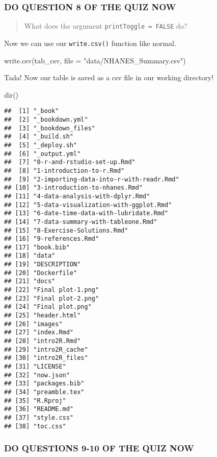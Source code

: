 \documentclass[
]{book}
\newenvironment{Shaded}{\begin{snugshade}}{\end{snugshade}}
\newcommand{\AttributeTok}[1]{\textcolor[rgb]{0.77,0.63,0.00}{#1}}
\newcommand{\FunctionTok}[1]{\textcolor[rgb]{0.00,0.00,0.00}{#1}}
\newcommand{\NormalTok}[1]{#1}
\newcommand{\StringTok}[1]{\textcolor[rgb]{0.31,0.60,0.02}{#1}}
\begin{document}
\hypertarget{do-question-8-of-the-quiz-now-3}{%
\subsubsection{DO QUESTION 8 OF THE QUIZ NOW}\label{do-question-8-of-the-quiz-now-3}}

\begin{quote}
What does the argument \texttt{printToggle\ =\ FALSE} do?
\end{quote}

Now we can use our \texttt{write.csv()} function like normal.

\begin{Shaded}
\begin{Highlighting}[]
\FunctionTok{write.csv}\NormalTok{(tab\_csv, }\AttributeTok{file =} \StringTok{"data/NHANES\_Summary.csv"}\NormalTok{)}
\end{Highlighting}
\end{Shaded}

Tada! Now our table is saved as a csv file in our working directory!

\begin{Shaded}
\begin{Highlighting}[]
\FunctionTok{dir}\NormalTok{()}
\end{Highlighting}
\end{Shaded}

\begin{verbatim}
##  [1] "_book"
##  [2] "_bookdown.yml"
##  [3] "_bookdown_files"
##  [4] "_build.sh"
##  [5] "_deploy.sh"
##  [6] "_output.yml"
##  [7] "0-r-and-rstudio-set-up.Rmd"
##  [8] "1-introduction-to-r.Rmd"
##  [9] "2-importing-data-into-r-with-readr.Rmd"
## [10] "3-introduction-to-nhanes.Rmd"
## [11] "4-data-analysis-with-dplyr.Rmd"
## [12] "5-data-visualization-with-ggplot.Rmd"
## [13] "6-date-time-data-with-lubridate.Rmd"
## [14] "7-data-summary-with-tableone.Rmd"
## [15] "8-Exercise-Solutions.Rmd"
## [16] "9-references.Rmd"
## [17] "book.bib"
## [18] "data"
## [19] "DESCRIPTION"
## [20] "Dockerfile"
## [21] "docs"
## [22] "Final plot-1.png"
## [23] "Final plot-2.png"
## [24] "Final plot.png"
## [25] "header.html"
## [26] "images"
## [27] "index.Rmd"
## [28] "intro2R.Rmd"
## [29] "intro2R_cache"
## [30] "intro2R_files"
## [31] "LICENSE"
## [32] "now.json"
## [33] "packages.bib"
## [34] "preamble.tex"
## [35] "R.Rproj"
## [36] "README.md"
## [37] "style.css"
## [38] "toc.css"
\end{verbatim}

\hypertarget{do-questions-9-10-of-the-quiz-now-1}{%
\subsubsection{DO QUESTIONS 9-10 OF THE QUIZ NOW}\label{do-questions-9-10-of-the-quiz-now-1}}
\end{document}
